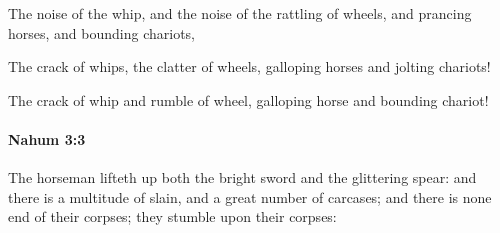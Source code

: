 			\begin{versebox}
					\item[BHS] 
					\item[LXX] 
					\item[ASV] The noise of the whip, and the noise of the rattling of wheels, and prancing horses, and bounding chariots,
					\item[NIV] The crack of whips, the clatter of wheels, galloping horses and jolting chariots!
					\item[NRSV] The crack of whip and rumble of wheel, galloping horse and bounding chariot!
			\end{versebox}

		\paragraph{Nahum 3:3} %
			\label{NAHUM-3-3}

			The horseman lifteth up both the bright sword and the glittering spear: and there is a multitude of slain, and a great number of carcases; and there is none end of their corpses; they stumble upon their corpses:

